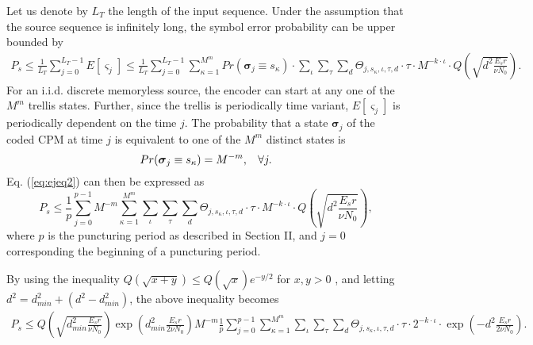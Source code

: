 \documentclass[12pt,twoside,onecolumn,a4paper,english]{IEEEtran2e}
\begin{document}
Let us denote by $L_T$ the length of the input sequence. Under the
assumption that the source sequence is infinitely long,
the symbol error probability can be upper bounded by %
\begin{eqnarray}\label{eq:ejeq2} %
P_s %
{\leq}%
\frac{1}{L_T}\sum_{j=0}^{L_T-1}E[\varsigma_j]{\leq}\frac{1}{L_T}\sum_{j=0}^{L_T-1}\sum_{\kappa=1}^{M^m}Pr({\mathbf{\boldsymbol{\sigma}}}_j
\equiv s_\kappa){\cdot} %
\sum_\iota\sum_\tau\sum_d{\Theta_{j,s_\kappa,\iota,\tau,d}}{\cdot}
{\tau}{\cdot}M^{-k{\cdot}\iota}{\cdot}Q(\sqrt{d^2\frac{E_sr}{\nu
N_0}}).
\end{eqnarray}
For
an i.i.d. discrete memoryless source, the encoder can start at any
one of the $M^m$ trellis states. Further, since the
trellis is periodically time variant, $E[\varsigma_j]$ is periodically dependent on the time
$j$.
 The probability that a state
$\mathbf{\boldsymbol{\sigma}}_j$ of the coded CPM at time
$j$
is equivalent to one of the $M^m$ distinct states is %
\begin{equation}%
Pr({\mathbf{\boldsymbol{\sigma}}}_j \equiv s_\kappa)=M^{-m},
\hspace{2ex} \forall{j}.
\end{equation}
Eq. (\ref{eq:ejeq2}) can then be expressed as\vspace{-1ex}
\begin{equation}\label{eq:ejeq3}%
P_s {\leq}
\frac{1}{p}\sum_{j=0}^{p-1}M^{-m}\sum_{\kappa=1}^{M^m}\sum_\iota\sum_\tau\sum_{d}{\Theta_{j,s_\kappa,\iota,\tau,d}}{\cdot}{\tau}{\cdot}M^{-k{\cdot}\iota}{\cdot}Q(\sqrt{d^2\frac{E_sr}{\nu
N_0}}),
\end{equation}
where $p$ is the puncturing period as described in Section II, and $j=0$ corresponding the beginning of a puncturing period.

By using the inequality $Q(\sqrt{x+y})\leq{Q(\sqrt{x})e^{-y/2}}$
for $x,y>0$ \cite{anderson}, and letting
$d^2=d^2_{min}+(d^2-d^2_{min})$, the above inequality becomes
\begin{eqnarray}\label{eq:ejeq4}%
P_s %
{\leq}%
Q\left(\sqrt{d_{min}^2\frac{E_sr}{\nu
N_0}}\right)\exp\left(d_{min}^2\frac{E_sr}{2\nu
N_0}\right)M^{-m}\frac{1}{p}\sum_{j=0}^{p-1}\sum_{\kappa=1}^{M^m}%
\sum_\iota\sum_\tau\sum_d{\Theta_{j,s_\kappa,\iota,\tau,d}}{\cdot}{\tau}{\cdot}2^{-k{\cdot}\iota}{\cdot}\exp({-d^2\frac{E_sr}{2\nu
N_0}}).
\end{eqnarray}
\end{document}

